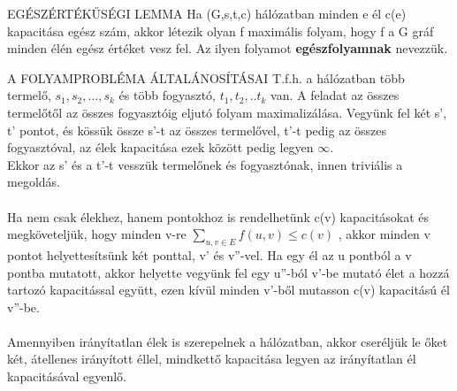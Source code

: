 \begin{tetel}{EGÉSZÉRTÉKŰSÉGI LEMMA}
Ha (G,s,t,c) hálózatban minden e él c(e) kapacitása egész szám, akkor létezik olyan f maximális folyam, hogy f a G gráf minden élén egész értéket vesz fel. Az ilyen folyamot \textbf{egészfolyamnak} nevezzük.
\end{tetel}

\begin{tetel}{A FOLYAMPROBLÉMA ÁLTALÁNOSÍTÁSAI}
T.f.h. a hálózatban több termelő, $s_1, s_2,...,s_k$ és több fogyasztó, $t_1, t_2,..t_k$ van. A feladat az összes termelőtől az összes fogyasztóig eljutó folyam maximalizálása. Vegyünk fel két s', t' pontot, és kössük össze s'-t az összes termelővel, t'-t pedig az összes fogyasztóval, az élek kapacitása ezek között pedig legyen $\infty$.
\\
Ekkor az s' és a t'-t vesszük termelőnek és fogyasztónak, innen triviális a megoldás.
\\
\\
Ha nem csak élekhez, hanem pontokhoz is rendelhetünk c(v) kapacitásokat és megköveteljük, hogy minden v-re
$\sum_{u,v\in E}^{} f(u,v) \leq c(v)$
, akkor minden v pontot helyettesítsünk két ponttal, v' és v''-vel. Ha egy él az u pontból a v pontba mutatott, akkor helyette vegyünk fel egy u''-ból v'-be mutató élet a hozzá tartozó kapacitással együtt, ezen kívül minden v'-ből mutasson c(v) kapacitású él v''-be.
\\
\\
Amennyiben irányítatlan élek is szerepelnek a hálózatban, akkor cseréljük le őket két, átellenes irányított éllel, mindkettő kapacitása legyen az irányítatlan él kapacitásával egyenlő.
\end{tetel}